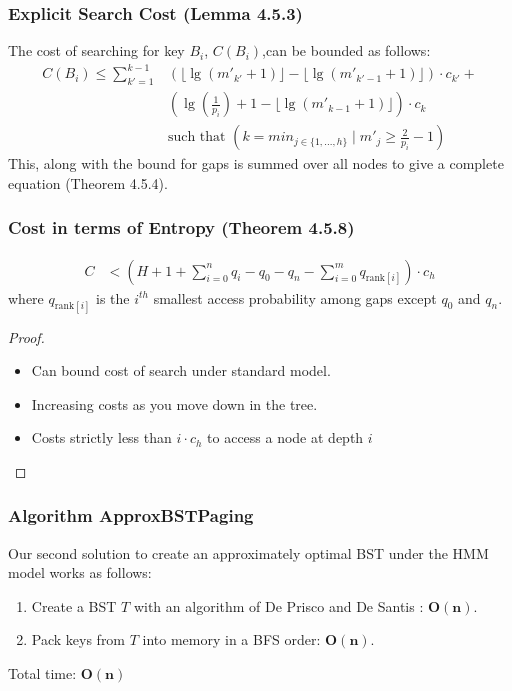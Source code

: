 \documentclass{beamer}
\theoremstyle{plain}
\begin{document}
\begin{frame}\frametitle{Explicit Search Cost (Lemma 4.5.3)}
The cost of searching for key $B_i$, $C(B_i)$,can be bounded as follows: 
\begin{align*} 
C(B_i) \leq  \sum_{k'=1}^{k-1} &\left(\lfloor \lg(m'_{k'}+1) \rfloor - \lfloor \lg(m'_{k'-1}+1) \rfloor \right)\cdot c_{k'} + \\
 &\left(\lg(\frac{1}{p_i}) + 1 - \lfloor \lg(m'_{k-1}+1) \rfloor \right)\cdot c_k \\
&\text{such that } \left( k=min_{j \in \{1, ..., h\}} \mid m'_j \geq \frac{2}{p_i}-1 \right) 
\end{align*}
This, along with the bound for gaps is summed over all nodes to give a complete equation (Theorem 4.5.4).
\end{frame}

\begin{frame}\frametitle{Cost in terms of Entropy (Theorem 4.5.8)}
\begin{align*}
C &< \left(H + 1 + \sum_{i=0}^n q_i - q_0 - q_n - \sum_{i=0}^m q_{\text{rank}[i]} \right) \cdot  c_h
\end{align*}
where $q_{\text{rank}[i]}$ is the $i^{th}$ smallest access probability among gaps except $q_0$ and $q_n$.
\begin{proof}
\begin{itemize}
\item Can bound cost of search under standard model.
\item Increasing costs as you move down in the tree.
\item Costs strictly less than $i \cdot c_h$ to access a node at depth $i$
\end{itemize}
\end{proof}
\end{frame}


\begin{frame} \frametitle{Algorithm ApproxBSTPaging}
Our second solution to create an approximately optimal BST under the HMM model works as follows: \\

\begin{enumerate}
\item Create a BST $T$ with an algorithm of De Prisco and De Santis \cite{de1993binary}: \textbf{$\mathbf{O(n)}$}. \\

\item Pack keys from $T$ into memory in a BFS order: \textbf{$\mathbf{O(n)}$}.
\end{enumerate}

Total time: $\mathbf{O(n)}$
\end{frame}
\end{document}

